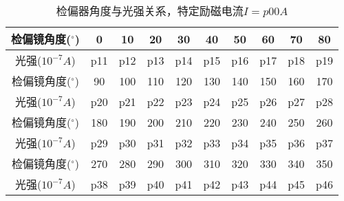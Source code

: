 \newpage
\begin{table}[H]
      \centering
      \begin{tabular}{|c|c|c|c|c|c|c|c|c|c|}
        \hline
        检偏镜角度(${}^{\circ}$) & 0 & 10 & 20 & 30 & 40 & 50 & 60 & 70 & 80 \\\hline
        光强($10^{-7} \si{A}$)  & p11 & p12 & p13 & p14 & p15 & p16 & p17 & p18 & p19 \\\hline
        检偏镜角度(${}^{\circ}$) & 90 & 100 & 110 & 120 & 130 & 140 & 150 & 160 & 170 \\\hline
        光强($10^{-7} \si{A}$)  & p20 & p21 & p22 & p23 & p24 & p25 & p26 & p27 & p28  \\\hline
        检偏镜角度(${}^{\circ}$) & 180 & 190 & 200 & 210 & 220 & 230 & 240 & 250 & 260  \\\hline
        光强($10^{-7} \si{A}$)  & p29 & p30 & p31 & p32 & p33 & p34 & p35 & p36 & p37 \\\hline
        检偏镜角度(${}^{\circ}$) & 270 & 280 & 290 & 300 & 310 & 320 & 330 & 340 & 350 \\\hline
        光强($10^{-7} \si{A}$)  & p38 & p39 & p40 & p41 & p42 & p43 & p44 & p45 & p46 \\\hline
      \end{tabular}
      \caption{检偏器角度与光强关系，特定励磁电流$I=p00 \si{A}$}
    \end{table}
